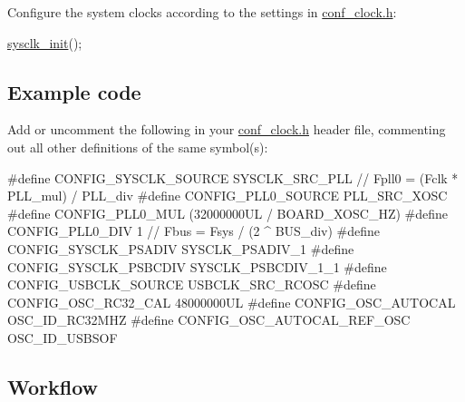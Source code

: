 \begin{DoxyEnumerate}
\item Configure the system clocks according to the settings in \hyperlink{conf__clock_8h}{conf\-\_\-clock.\-h}\-: 
\begin{DoxyCode}
 \hyperlink{group__sysclk__group_ga242399e48a97739c88b4d0c00f6101de}{sysclk\_init}(); 
\end{DoxyCode}

\end{DoxyEnumerate}\hypertarget{sysclk_quickstart_use_case_2_sysclk_quickstart_use_case_2_example_code}{}\subsection{Example code}\label{sysclk_quickstart_use_case_2_sysclk_quickstart_use_case_2_example_code}
Add or uncomment the following in your \hyperlink{conf__clock_8h}{conf\-\_\-clock.\-h} header file, commenting out all other definitions of the same symbol(s)\-: 
\begin{DoxyCode}
\textcolor{preprocessor}{           #define CONFIG\_SYSCLK\_SOURCE        SYSCLK\_SRC\_PLL}
\textcolor{preprocessor}{}
           \textcolor{comment}{// Fpll0 = (Fclk * PLL\_mul) / PLL\_div}
\textcolor{preprocessor}{           #define CONFIG\_PLL0\_SOURCE          PLL\_SRC\_XOSC}
\textcolor{preprocessor}{}\textcolor{preprocessor}{           #define CONFIG\_PLL0\_MUL             (32000000UL / BOARD\_XOSC\_HZ)}
\textcolor{preprocessor}{}\textcolor{preprocessor}{           #define CONFIG\_PLL0\_DIV             1}
\textcolor{preprocessor}{}
           \textcolor{comment}{// Fbus = Fsys / (2 ^ BUS\_div)}
\textcolor{preprocessor}{           #define CONFIG\_SYSCLK\_PSADIV        SYSCLK\_PSADIV\_1}
\textcolor{preprocessor}{}\textcolor{preprocessor}{           #define CONFIG\_SYSCLK\_PSBCDIV       SYSCLK\_PSBCDIV\_1\_1}
\textcolor{preprocessor}{}
\textcolor{preprocessor}{           #define CONFIG\_USBCLK\_SOURCE        USBCLK\_SRC\_RCOSC}
\textcolor{preprocessor}{}\textcolor{preprocessor}{           #define CONFIG\_OSC\_RC32\_CAL         48000000UL}
\textcolor{preprocessor}{}\textcolor{preprocessor}{           #define CONFIG\_OSC\_AUTOCAL          OSC\_ID\_RC32MHZ}
\textcolor{preprocessor}{           #define CONFIG\_OSC\_AUTOCAL\_REF\_OSC  OSC\_ID\_USBSOF}
\end{DoxyCode}
\hypertarget{sysclk_quickstart_use_case_2_sysclk_quickstart_use_case_2_example_workflow}{}\subsection{Workflow}\label{sysclk_quickstart_use_case_2_sysclk_quickstart_use_case_2_example_workflow}

